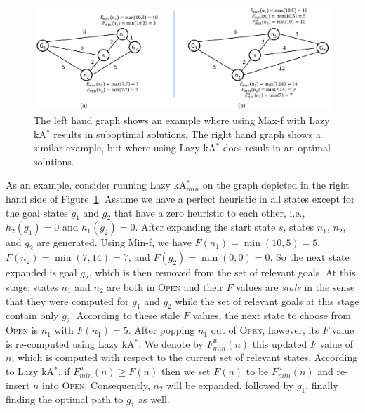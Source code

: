 \documentclass{aicom2e}
\newcommand{\kastar}{kA$^*$}
\newcommand{\kastarmin}{kA$^*_{min}$}
\newcommand{\minf}{Min-f}
\newcommand{\maxf}{Max-f}
\newcommand{\open}{\textsc{Open}}
\begin{document}
\begin{figure}
	\includegraphics[width=\textwidth]{Lazy_cropped.pdf}      
	\caption{The left hand graph shows an example where using \maxf{} with Lazy \kastar{} results in suboptimal solutions. The right hand graph shows a similar example, but where using Lazy \kastar{} does result in an optimal solutions.}
	\label{fig:lazy}
\end{figure}

As an example, consider running Lazy \kastarmin{} on the graph depicted in the right hand side of Figure~\ref{fig:lazy}. Assume we have a perfect heuristic in all states except for the goal states $g_1$ and $g_2$ that have a zero heuristic to each other, i.e., $h_2(g_1)=0$ and $h_1(g_2)=0$. After expanding the start state $s$, states $n_1$, $n_2$, and $g_2$ are generated. Using \minf{}, we have $F(n_1)=\min(10,5)=5$, $F(n_2)=\min(7,14)=7$, and $F(g_2)=\min(0,0)=0$. So the next state expanded is goal $g_2$, which is then removed from the set of relevant goals. At this stage, states $n_1$ and $n_2$ are both in \open{} and their $F$ values are {\em stale} in the sense that they were computed for $g_1$ and $g_2$ while the set of relevant goals at this stage contain only $g_2$. According to these stale $F$ values, the next state to choose from \open{} is $n_1$ with $F(n_1)=5$. After popping $n_1$ out of \open{}, however, its $F$ value is re-computed  using Lazy \kastar{}. We denote by $F^u_{min}(n)$ this updated $F$ value of $n$, which is computed with respect to the current set of relevant states. According to Lazy \kastar{}, if $F^u_{min}(n)\geq F(n)$ then we set $F(n)$ to be $F^u_{min}(n)$ and re-insert $n$ into \open{}. Consequently, $n_2$ will be expanded, followed by $g_1$, finally finding the optimal path to $g_1$ as well. 
\end{document}
